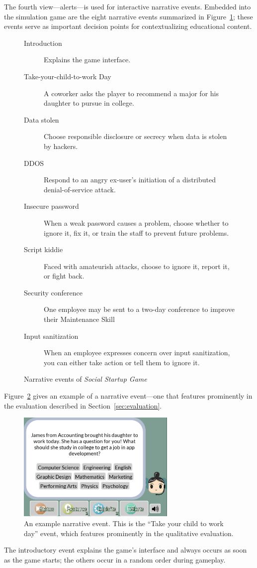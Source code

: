 \documentclass[letterpaper]{article}
\begin{document}
The fourth view---alerts---is used for interactive narrative events.
Embedded into the simulation
game are the eight narrative events summarized in
Figure~\ref{fig:event-list}; these events serve as important decision
points for contextualizing educational content.
%
\begin{figure}
\begin{framed}
\begin{description}
\item[Introduction] Explains the game interface.
\item[Take-your-child-to-work Day] A coworker asks the player to 
 recommend a major for his daughter to pursue in college.
\item[Data stolen] Choose responsible disclosure or secrecy when 
 data is stolen by hackers.
\item[DDOS] Respond to an angry ex-user's initiation of a distributed
 denial-of-service attack.
\item[Insecure password] When a weak password causes a problem,
 choose whether to ignore it, fix it, or train the staff to prevent
 future problems.
\item[Script kiddie] Faced with amateurish attacks, choose to 
 ignore it, report it, or fight back.
\item[Security conference] One employee may be sent to a two-day
 conference to improve their Maintenance Skill
\item[Input sanitization] When an employee expresses concern over
 input sanitization, you can either take action or tell them to ignore it.
\end{description}
\caption{Narrative events of \textit{Social Startup Game}}
\label{fig:event-list}
\end{framed}
\end{figure}
%
Figure~\ref{fig:james-from-accounting} gives an example of a narrative
event---one that features prominently in the evaluation described
in Section~\ref{sec:evaluation}.
%
\begin{figure}\centering
\begin{framed}
\includegraphics[width=3in]{images/james-from-accounting.png}
\caption{An example narrative event. This is the ``Take your child to
 work day'' event, which features prominently in the qualitative
 evaluation.}
\label{fig:james-from-accounting}
\end{framed}
\end{figure}
%
The introductory event explains the game's interface and always occurs
as soon as the game starts; the others occur in a random order during
gameplay.
\end{document}
